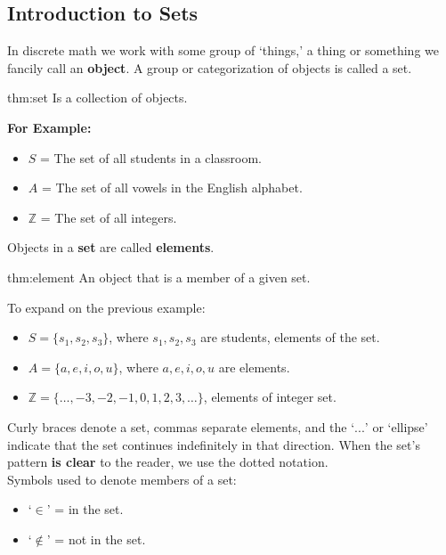 \subsection{Introduction to Sets}
\hspace*{1em}
In discrete math we work with some group of `things,' a thing or something
we fancily call an \textbf{object}. A group or categorization of objects is called a set.

\begin{theo}[Set]{thm:set}
    Is a collection of objects.
\end{theo}

\noindent
\textbf{For Example:}
\begin{itemize}
    \item $S$ = The set of all students in a classroom.
    \item $A$ = The set of all vowels in the English alphabet.
    \item $\mathbb{Z}$ = The set of all integers.

\end{itemize}
Objects in a \textbf{set} are called \textbf{elements}.

\begin{theo}[Element]{thm:element}
    An object that is a member of a given set.
\end{theo}


\newpage
\noindent
To expand on the previous example:
\begin{itemize}
    \item $S = \{s_1, s_2, s_3\}$, where $s_1, s_2, s_3$ are students, elements of the set.
    \item $A = \{a, e, i, o, u\}$, where $a, e, i, o, u$ are elements.
    \item $\mathbb{Z} = \{\ldots, -3, -2, -1, 0, 1, 2, 3, \ldots\}$, elements of integer set.
\end{itemize}
Curly braces denote a set, commas separate elements, and
the `$...$' or `ellipse' indicate that the set continues indefinitely in that direction.
When the set's pattern \textbf{is clear} to the reader, we use the dotted notation.\\

\noindent
Symbols used to denote members of a set:
\begin{itemize}
    \item `$\in$' = in the set.
    \item `$\notin$' = not in the set.
\end{itemize}

